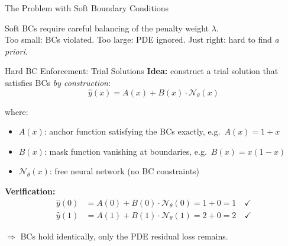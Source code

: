 \documentclass[aspectratio=169,11pt]{beamer}
\newcommand{\emphc}[1]{\textcolor{harvardcrimson}{#1}}
\begin{document}
\begin{frame}{The Problem with Soft Boundary Conditions}
\vspace{0.4em}
\begin{center}
{\small Soft BCs require \emphc{careful balancing} of the penalty weight $\lambda$.\\
Too small: BCs violated. Too large: PDE ignored. Just right: hard to find \emph{a priori}.}
\end{center}
\end{frame}

\begin{frame}{Hard BC Enforcement: Trial Solutions}
\textbf{Idea:} construct a \emphc{trial solution} that satisfies BCs \emph{by construction}:
\[
\boxed{
\hat{y}(x) = A(x) + B(x)\cdot\mathcal{N}_\theta(x)
}
\]

\vspace{0.2em}
where:
\begin{itemize}
    \item $A(x)$: \emphc{anchor function} satisfying the BCs exactly, e.g.\ $A(x) = 1 + x$
    \item $B(x)$: \emphc{mask function} vanishing at boundaries, e.g.\ $B(x) = x(1-x)$
    \item $\mathcal{N}_\theta(x)$: free neural network (no BC constraints)
\end{itemize}

\vspace{0.3em}
\textbf{Verification:}
\begin{align*}
\hat{y}(0) &= A(0) + B(0)\cdot\mathcal{N}_\theta(0) = 1 + 0 = 1 \quad\checkmark\\
\hat{y}(1) &= A(1) + B(1)\cdot\mathcal{N}_\theta(1) = 2 + 0 = 2 \quad\checkmark
\end{align*}

$\Rightarrow$ BCs hold \emphc{identically}, only the PDE residual loss remains.
\end{frame}
\end{document}
